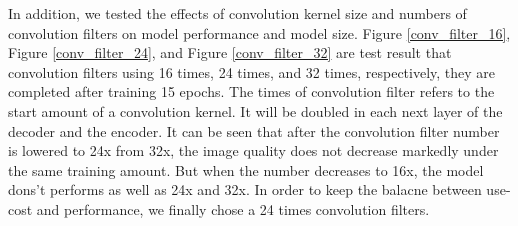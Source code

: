 In addition, we tested the effects of convolution kernel size and numbers of convolution filters on model performance and model size.
Figure \ref{conv_filter_16}, Figure \ref{conv_filter_24}, and Figure \ref{conv_filter_32} are test result that convolution filters using 16 times, 24 times, and 32 times,
    respectively, they are completed after training 15 epochs.
The times of convolution filter refers to the start amount of a convolution kernel.
It will be doubled in each next layer of the decoder and the encoder.
It can be seen that after the convolution filter number is lowered to 24x from 32x,
    the image quality does not decrease markedly under the same training amount.
But when the number decreases to 16x, the model dons't performs as well as 24x and 32x.
In order to keep the balacne between use-cost and performance,
    we finally chose a 24 times convolution filters.

